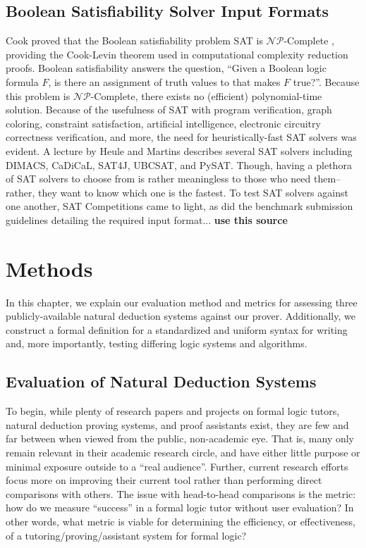 \documentclass[ms]{uncgdissertationexp2}
\theoremstyle{plain}
\theoremstyle{definition}
\theoremstyle{remark}
\begin{document}
\section{Boolean Satisfiability Solver Input Formats} 
Cook proved that the Boolean satisfiability problem SAT is $\mathcal{NP}$-Complete \cite{cook}, providing the Cook-Levin theorem used in computational complexity reduction proofs. Boolean satisfiability answers the question, ``Given a Boolean logic formula $F$, is there an assignment of truth values to that makes $F$ true?''. Because this problem is $\mathcal{NP}$-Complete, there exists no (efficient) polynomial-time solution. Because of the usefulness of SAT with program verification, graph coloring, constraint satisfaction, artificial intelligence, electronic circuitry correctness verification, and more, the need for heuristically-fast SAT solvers was evident. A lecture by Heule and Martins \cite{satsolvers} describes several SAT solvers including DIMACS, CaDiCaL, SAT4J, UBCSAT, and PySAT. Though, having a plethora of SAT solvers to choose from is rather meaningless to those who need them--rather, they want to know which one is the fastest. To test SAT solvers against one another, SAT Competitions came to light, as did the benchmark submission guidelines detailing the required input format... \textbf{use this source \cite{satbenchmark}}

\chapter{Methods}\label{chapter:3}
In this chapter, we explain our evaluation method and metrics for assessing three publicly-available natural deduction systems against our prover. Additionally, we construct a formal definition for a standardized and uniform syntax for writing and, more importantly, testing differing logic systems and algorithms.

\section{Evaluation of Natural Deduction Systems}
To begin, while plenty of research papers and projects on formal logic tutors, natural deduction proving systems, and proof assistants exist, they are few and far between when viewed from the public, non-academic eye. That is, many only remain relevant in their academic research circle, and have either little purpose or minimal exposure outside to a ``real audience''. Further, current research efforts focus more on improving their current tool rather than performing direct comparisons with others. The issue with head-to-head comparisons is the metric: how do we measure ``success'' in a formal logic tutor without user evaluation? In other words, what metric is viable for determining the efficiency, or effectiveness, of a tutoring/proving/assistant system for formal logic?
\end{document}
